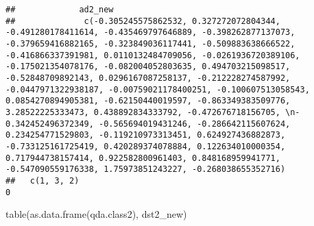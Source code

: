 \documentclass[
  11pt,
]{article}
\newenvironment{Shaded}{\begin{snugshade}}{\end{snugshade}}
\newcommand{\FunctionTok}[1]{\textcolor[rgb]{0.00,0.00,0.00}{#1}}
\newcommand{\NormalTok}[1]{#1}
\begin{document}
\begin{verbatim}
##             ad2_new
##              c(-0.305245575862532, 0.327272072804344, -0.491280178411614, -0.435469797646889, -0.398262877137073, -0.379659416882165, -0.323849036117441, -0.509883638666522, -0.416866337391981, 0.0110132484709056, -0.0261936720389106, -0.175021354078176, -0.082004052803635, 0.494703215098517, -0.52848709892143, 0.0296167087258137, -0.212228274587992, -0.0447971322938187, -0.00759021178400251, -0.100607513058543, 0.0854270894905381, -0.62150440019597, -0.863349383509776, 3.28522225333473, 0.438892834333792, -0.472676718156705, \n-0.342452496372349, -0.565694019431246, -0.286642115607624, 0.234254771529803, -0.119210973313451, 0.624927436882873, -0.733125161725419, 0.420289374078884, 0.122634010000354, 0.717944738157414, 0.922582800961403, 0.848168959941771, -0.547090559176338, 1.75973851243227, -0.268038655352716)
##   c(1, 3, 2)                                                                                                                                                                                                                                                                                                                                                                                                                                                                                                                                                                                                                                                                                                                                                                                                                                           0
\end{verbatim}

\begin{Shaded}
\begin{Highlighting}[]
\FunctionTok{table}\NormalTok{(}\FunctionTok{as.data.frame}\NormalTok{(qda.class2), dst2\_new)}
\end{Highlighting}
\end{Shaded}
\end{document}
